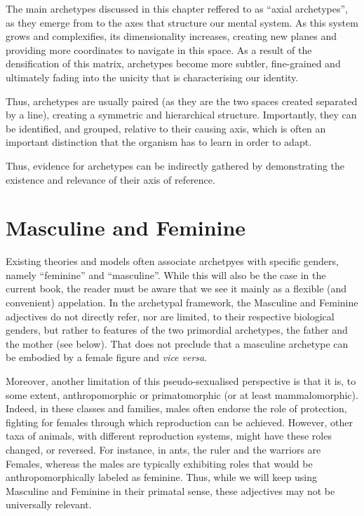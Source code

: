 \documentclass[
]{book}
\begin{document}
The main archetypes discussed in this chapter reffered to as ``axial archetypes'', as they emerge from to the axes that structure our mental system. As this system grows and complexifies, its dimensionality increases, creating new planes and providing more coordinates to navigate in this space. As a result of the densification of this matrix, archetypes become more subtler, fine-grained and ultimately fading into the unicity that is characterising our identity.

Thus, archetypes are usually paired (as they are the two spaces created separated by a line), creating a symmetric and hierarchical structure. Importantly, they can be identified, and grouped, relative to their causing axis, which is often an important distinction that the organism has to learn in order to adapt.

Thus, evidence for archetypes can be indirectly gathered by demonstrating the existence and relevance of their axis of reference.

\hypertarget{masculine-and-feminine}{%
\section{Masculine and Feminine}\label{masculine-and-feminine}}

Existing theories and models often associate archetpyes with specific genders, namely ``feminine'' and ``masculine''. While this will also be the case in the current book, the reader must be aware that we see it mainly as a flexible (and convenient) appelation. In the archetypal framework, the Masculine and Feminine adjectives do not directly refer, nor are limited, to their respective biological genders, but rather to features of the two primordial archetypes, the father and the mother (see below). That does not preclude that a masculine archetype can be embodied by a female figure and \emph{vice versa}.

Moreover, another limitation of this pseudo-sexualised perspective is that it is, to some extent, anthropomorphic or primatomorphic (or at least mammalomorphic). Indeed, in these classes and families, males often endorse the role of protection, fighting for females through which reproduction can be achieved. However, other taxa of animals, with different reproduction systems, might have these roles changed, or reversed. For instance, in ants, the ruler and the warriors are Females, whereas the males are typically exhibiting roles that would be anthropomorphically labeled as feminine. Thus, while we will keep using Masculine and Feminine in their primatal sense, these adjectives may not be universally relevant.
\end{document}
